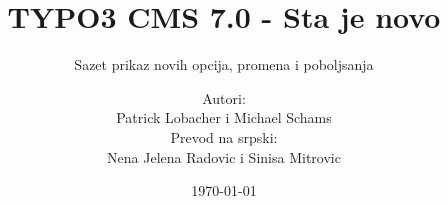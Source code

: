 %

%
%

\documentclass[t]{beamer}

\beamertemplatenavigationsymbolsempty

{
	\usetheme{typo3slides}
}

\title{TYPO3 CMS 7.0 - Sta je novo}
\subtitle{Sazet prikaz novih opcija, promena i poboljsanja}
\author{
	\centerline{Autori:}
	\centerline{Patrick Lobacher i Michael Schams}
	\vspace{0.4cm}
	\centerline{Prevod na srpski:}
	\centerline{Nena Jelena Radovic i Sinisa Mitrovic}
}

\date{\today}



\sharefont


\begingroup
	[default]
	\begin{frame}
		\titlepage
	\end{frame}
\endgroup



\section*{TYPO3 CMS 7.0 - Sta je novo}
\begin{frame}[fragile]
	\frametitle{Sadrzaj}
	\framesubtitle{Sadrzaj}

	\begin{multicols}{2}
		\tableofcontents
	\end{multicols}

\end{frame}

